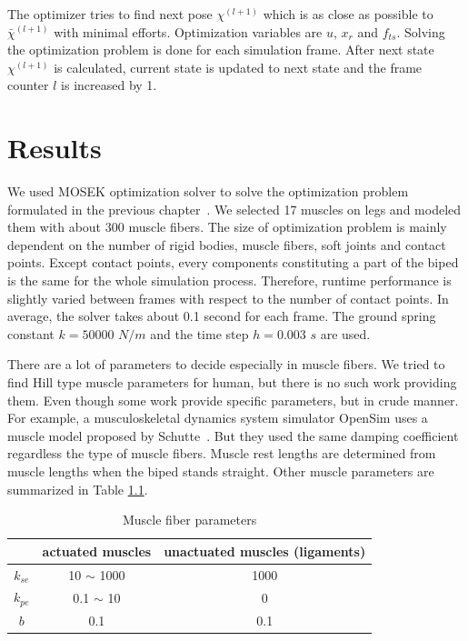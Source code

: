 \documentclass[master,english,final]{kaist-ucs}
\begin{document}
The optimizer tries to find next pose $\chi^{(l+1)}$ which is as close as possible
to $\bar{\chi}^{(l+1)}$ with minimal efforts.
Optimization variables are $u$, $x_r$ and $f_{ts}$.
Solving the optimization problem is done for each simulation frame.
After next state $\chi^{(l+1)}$ is calculated, current state is updated to
next state and the frame counter $l$ is increased by 1.




\chapter{Results}


We used MOSEK optimization solver to solve
the optimization problem formulated in the previous chapter~\cite{mosek}.
We selected 17 muscles on legs and modeled them with about 300 muscle fibers.
The size of optimization problem is mainly
dependent on the number of rigid bodies, muscle fibers, soft joints
and contact points. Except contact points, every components
constituting a part of the biped is the same for the whole simulation process.
Therefore, runtime performance is slightly varied between frames
with respect to the number of contact points. In average, the solver takes
about 0.1 second for each frame. The ground spring constant $k=50000$ $N/m$ and
the time step $h=0.003$ $s$ are used.

There are a lot of parameters to decide especially in muscle fibers.
We tried to find Hill type muscle parameters for human, but there is no
such work providing them. Even though some work provide specific parameters,
but in crude manner. For example, a musculoskeletal dynamics system simulator
OpenSim uses a muscle model proposed by Schutte~\cite{Delp07}. But they used
the same damping coefficient regardless the type of muscle fibers.
Muscle rest lengths are determined from muscle lengths
when the biped stands straight. Other muscle parameters are summarized in Table \ref{musparm}.

\begin{table}[h!]
\centering
  \begin{tabular}{ccc}
            &  actuated muscles      &  unactuated muscles (ligaments) \\
  \hline
  $k_{se}$  &        10 $\sim$ 1000  &           1000                  \\
  $k_{pe}$  &        0.1 $\sim$ 10   &           0                     \\
  $b$       &        0.1             &           0.1                   \\
  \hline
\end{tabular}
\caption{Muscle fiber parameters}
\label{musparm}
\end{table}
\end{document}
